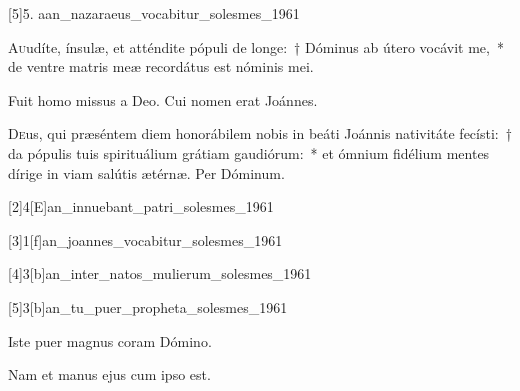 \documentclass[vesperale_romanum.tex]{subfiles}
\begin{document}
[5]{5. a}{an_nazaraeus_vocabitur_solesmes_1961}


\lettrine{A}{u}udíte, ínsulæ, et atténdite pópuli de longe:~† Dóminus ab útero vocávit me,~* de ventre matris meæ recordátus est nóminis mei.

\label{hy_ut_queant_laxis} \hymnus



\vv Fuit homo missus a Deo. \rr Cui nomen erat Joánnes.

\label{an_ingresso_zacharia_june_24_solesmes_1961}
{}


\oratio

\lettrine{D}{e}us, qui præséntem diem honorábilem nobis in beáti Joánnis nativitáte fecísti:~† da pópulis tuis spirituálium grátiam gaudiórum:~* et ó\-mnium fidélium mentes dírige in viam salútis ætérnæ.
Per Dóminum.




[2]{4}[E]{an_innuebant_patri_solesmes_1961}

[3]{1}[f]{an_joannes_vocabitur_solesmes_1961}


[4]{3}[b]{an_inter_natos_mulierum_solesmes_1961}

[5]{3}[b]{an_tu_puer_propheta_solesmes_1961}


\vv Iste puer magnus coram Dómino.

\rr Nam et manus ejus cum i\-pso est.
\end{document}
